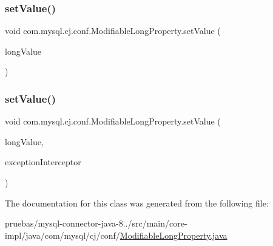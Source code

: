 \subsubsection{\texorpdfstring{set\+Value()}{setValue()}\hspace{0.1cm}{\footnotesize\ttfamily [1/2]}}
{\footnotesize\ttfamily void com.\+mysql.\+cj.\+conf.\+Modifiable\+Long\+Property.\+set\+Value (\begin{DoxyParamCaption}\item[{Long}]{long\+Value }\end{DoxyParamCaption})}

\mbox{\label{classcom_1_1mysql_1_1cj_1_1conf_1_1_modifiable_long_property_a6efa9fc60605885fe63c9011666e2326}} 
\subsubsection{\texorpdfstring{set\+Value()}{setValue()}\hspace{0.1cm}{\footnotesize\ttfamily [2/2]}}
{\footnotesize\ttfamily void com.\+mysql.\+cj.\+conf.\+Modifiable\+Long\+Property.\+set\+Value (\begin{DoxyParamCaption}\item[{Long}]{long\+Value,  }\item[{\mbox{\hyperlink{interfacecom_1_1mysql_1_1cj_1_1exceptions_1_1_exception_interceptor}{Exception\+Interceptor}}}]{exception\+Interceptor }\end{DoxyParamCaption})}



The documentation for this class was generated from the following file\+:\begin{DoxyCompactItemize}
\item 
pruebas/mysql-\/connector-\/java-\/8../src/main/core-\/impl/java/com/mysql/cj/conf/\mbox{\hyperlink{_modifiable_long_property_8java}{Modifiable\+Long\+Property.\+java}}\end{DoxyCompactItemize}

